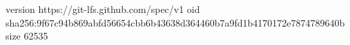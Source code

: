 version https://git-lfs.github.com/spec/v1
oid sha256:9f67c94b869abfd56654cbb6b43638d364460b7a9fd1b4170172e7874789640b
size 62535
